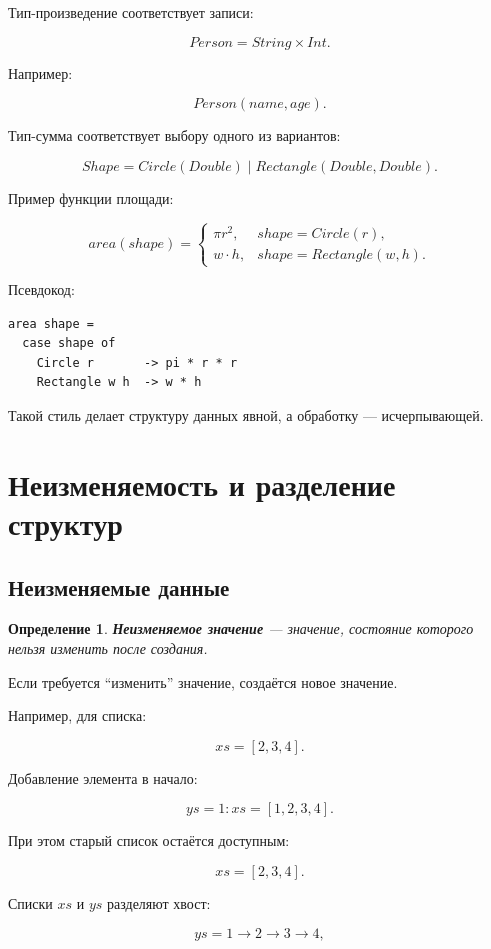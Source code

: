 \documentclass[12pt,a4paper]{article}
\newtheorem{definition}{Определение}
\begin{document}
Тип-произведение соответствует записи:

\[
Person = String \times Int.
\]

Например:

\[
Person(name, age).
\]

Тип-сумма соответствует выбору одного из вариантов:

\[
Shape = Circle(Double) \mid Rectangle(Double, Double).
\]

Пример функции площади:

\[
area(shape) =
\begin{cases}
\pi r^2, & shape = Circle(r), \\
w \cdot h, & shape = Rectangle(w,h).
\end{cases}
\]

Псевдокод:

\begin{lstlisting}
area shape =
  case shape of
    Circle r       -> pi * r * r
    Rectangle w h  -> w * h
\end{lstlisting}

Такой стиль делает структуру данных явной, а обработку --- исчерпывающей.

\section{Неизменяемость и разделение структур}

\subsection{Неизменяемые данные}

\begin{definition}
\textbf{Неизменяемое значение} --- значение, состояние которого нельзя изменить после создания.
\end{definition}

Если требуется ``изменить'' значение, создаётся новое значение.

Например, для списка:

\[
xs = [2,3,4].
\]

Добавление элемента в начало:

\[
ys = 1 : xs = [1,2,3,4].
\]

При этом старый список остаётся доступным:

\[
xs = [2,3,4].
\]

Списки $xs$ и $ys$ разделяют хвост:

\[
ys = 1 \to 2 \to 3 \to 4,
\]
\end{document}

